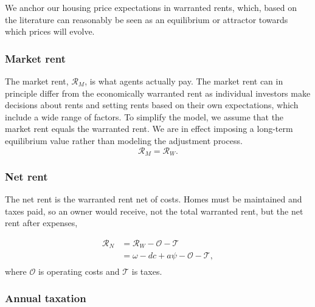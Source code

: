  We anchor our housing price expectations in warranted rents, which, based on the literature can reasonably be seen as an equilibrium or attractor towards which prices will evolve. 

 
\subsubsection{Market rent} \label{section-market-rent}
The \gls{market rent}, $\mathcal{R}_M$, is what agents actually pay. The market rent can in principle differ from the economically warranted rent as individual investors make decisions about rents and setting rents based on their own expectations, which include a wide range of factors. To simplify the model, we assume that the market rent equals the warranted rent. We are in effect imposing a long-term equilibrium value rather than modeling the adjustment process.  %
\[\mathcal{R}_M = \mathcal{R}_W.\] 


\subsubsection{Net rent} \label{section-net-rent}
The \gls{net rent} is the warranted rent net of costs. Homes must be maintained and taxes paid, so an owner would receive, not the total warranted rent, but the net rent after expenses,

\begin{align}
\mathcal{R}_N &= \mathcal{R}_W - \mathcal{O} - \mathcal{T}\\
&= \omega - {dc} + a\psi -  \mathcal{O} - \mathcal{T}, \\
\end{align}
where $\mathcal{O}$ is operating costs and $\mathcal{T}$ is taxes. 






\subsubsection{Annual taxation}

